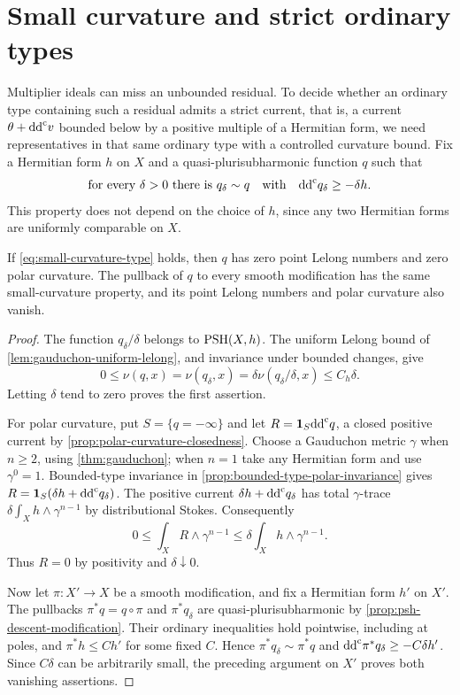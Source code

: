 \section{Small curvature and strict ordinary types}
\label{sec:small-curvature-strict-types}

Multiplier ideals can miss an unbounded residual. To decide whether an
ordinary type containing such a residual admits a strict current, that
is, a current $\theta+\mathrm{dd}^{\mathrm{c}} v$ bounded below by a positive multiple of a
Hermitian form, we need representatives in that same ordinary type with
a controlled curvature bound. Fix a Hermitian form $h$ on $X$ and a
quasi-plurisubharmonic function $q$ such that
\begin{equation}\label{eq:small-curvature-type}
 \text{for every }\delta>0\text{ there is }q_\delta\sim q
 \quad\text{with}\quad\mathrm{dd}^{\mathrm{c}} q_\delta\geq-\delta h.
\end{equation}
This property does not depend on the choice of $h$, since any two
Hermitian forms are uniformly comparable on $X$.

\begin{lemma}\label{lem:small-curvature-zero-lelong}
If \eqref{eq:small-curvature-type} holds, then $q$ has zero point Lelong
numbers and zero polar curvature. The pullback of $q$ to every smooth
modification has the same small-curvature property,
and its point Lelong numbers and polar curvature also vanish.
\end{lemma}
\begin{proof}
The function $q_\delta/\delta$ belongs to $\mathrm{PSH}(X,h)$.
The uniform Lelong bound of \cref{lem:gauduchon-uniform-lelong}, and
invariance under bounded changes, give
\[
 0\leq\nu(q,x)=\nu(q_\delta,x)
       =\delta\nu(q_\delta/\delta,x)\leq C_h\delta.
\]
Letting $\delta$ tend to zero proves the first assertion.

For polar curvature, put $S=\{q=-\infty\}$ and let
$R=\mathbf1_S\mathrm{dd}^{\mathrm{c}} q$, a closed positive current by
\cref{prop:polar-curvature-closedness}. Choose a Gauduchon metric $\gamma$
when $n\geq2$, using \cref{thm:gauduchon}; when $n=1$ take any Hermitian
form and use $\gamma^0=1$. Bounded-type invariance in
\cref{prop:bounded-type-polar-invariance} gives
$R=\mathbf1_S(\delta h+\mathrm{dd}^{\mathrm{c}} q_\delta)$. The positive current
$\delta h+\mathrm{dd}^{\mathrm{c}} q_\delta$ has total $\gamma$-trace
$\delta\int_Xh\wedge\gamma^{n-1}$ by distributional Stokes. Consequently
\[
 0\leq\int_XR\wedge\gamma^{n-1}
      \leq\delta\int_Xh\wedge\gamma^{n-1}.
\]
Thus $R=0$ by positivity and $\delta\downarrow0$.

Now let $\pi\colon X'\to X$ be a smooth modification,
and fix a Hermitian form $h'$ on $X'$. The pullbacks $\pi^*q=q\circ\pi$
and $\pi^*q_\delta$ are quasi-plurisubharmonic by
\cref{prop:psh-descent-modification}. Their ordinary inequalities hold
pointwise, including at poles, and $\pi^*h\leq Ch'$ for some fixed $C$.
Hence $\pi^*q_\delta\sim\pi^*q$ and
$\mathrm{dd}^{\mathrm{c}}\pi^*q_\delta\geq-C\delta h'$. Since $C\delta$ can be arbitrarily
small, the preceding argument on $X'$ proves both vanishing assertions.
\end{proof}

